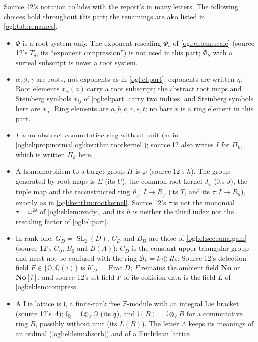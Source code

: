 \documentclass[11pt,oneside]{article}
\numberwithin{equation}{section}
\theoremstyle{definition}
\theoremstyle{remark}
\newcommand{\No}{\mathbf{No}}
\newcommand{\SC}{\No[i]}
\newcommand{\Z}{\mathbb Z}
\newcommand{\Q}{\mathbb Q}
\newcommand{\Bk}{\mathcal B_k}
\newcommand{\SL}{\operatorname{SL}}
\newcommand{\Frac}{\operatorname{Frac}}
\begin{document}
Source 12's notation collides with the report's in many letters. The following
choices hold throughout this part; the renamings are also listed in
\cref{ogl:tab:renames}.
\begin{itemize}[leftmargin=*]
\item $\Phi$ is a root system only. The exponent rescaling $\Phi_h$ of
\cref{ogl:el:lem:scale} (source 12's $T_\delta$, its ``exponent
compression'') is not used in this part; $\Phi_h$ with a surreal subscript is
never a root system.
\item $\alpha,\beta,\gamma$ are roots, not exponents as in \cref{ogl:el:part};
exponents are written $\eta$. Root elements $x_\alpha(a)$ carry a root
subscript; the abstract root maps and Steinberg symbols $x_{ij}$ of
\cref{ogl:el:part} carry two indices, and Steinberg symbols here are
$\tilde x_\alpha$. Ring elements are $a,b,c,r,s,t$; no bare $x$ is a ring
element in this part.
\item $I$ is an abstract commutative ring without unit (as in
\cref{ogl:el:prop:normal,ogl:ker:thm:rootkernel}); source 12 also writes $I$
for $\Pi_k$, which is written $\Pi_k$ here.
\item A homomorphism to a target group $H$ is $\varphi$ (source 12's $h$). The
group generated by root maps is $\Sigma$ (its $U$), the common root kernel
$J_\varphi$ (its $J$), the tuple map and the reconstructed ring
$\vartheta_\varphi:I\to R_\varphi$ (its $T$, and its $\tau:I\to R_h$), exactly
as in \cref{ogl:ker:thm:rootkernel}. Source 12's $\tau$ is not the monomial
$\tau=\omega^{2\delta}$ of \cref{ogl:el:lem:ready}, and its $h$ is neither the
third index nor the rescaling factor of \cref{ogl:el:part}.
\item In rank one, $G_D=\SL_2(D)$, $C_D$ and $B_D$ are those of
\cref{ogl:el:sec:amalgam} (source 12's $G_0$, $B_0$ and $B(A)$); $C_D$ is the
constant upper triangular group and must not be confused with the ring
$\Bk=k\oplus\Pi_k$. Source 12's detection field $F\in\{\Q,\Q(i)\}$ is
$K_D=\Frac D$; $F$ remains the ambient field $\No$ or $\SC$, and source 12's
set field $F$ of its collision data is the field $L$ of
\cref{ogl:el:lem:compress}.
\item A Lie lattice is $\mathfrak l$, a finite-rank free $\Z$-module with an
integral Lie bracket (source 12's $\Lambda$); $\mathfrak l_\Q=\mathfrak l\otimes_\Z\Q$
(its $\mathfrak g$), and $\mathfrak l(B)=\mathfrak l\otimes_\Z B$ for a commutative
ring $B$, possibly without unit (its $L(B)$). The letter $\Lambda$ keeps its
meanings of an ordinal (\cref{ogl:el:lem:absorb}) and of a Euclidean lattice

\end{itemize}
\end{document}
